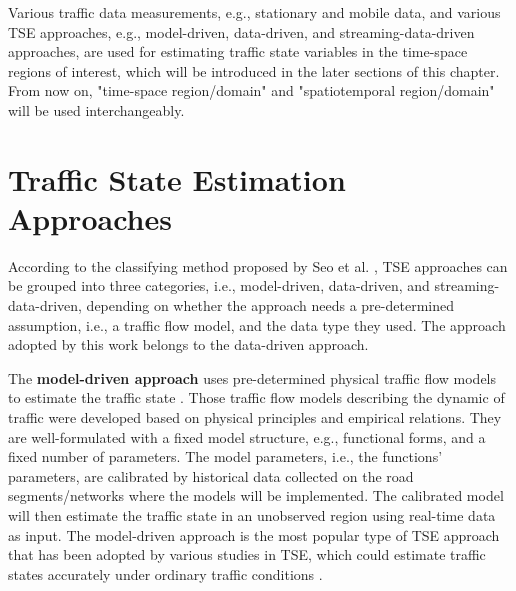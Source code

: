 \documentclass[english]{kththesis}
\begin{document}
Various traffic data measurements, e.g., stationary and mobile data, and various TSE approaches, e.g., model-driven, data-driven, and streaming-data-driven approaches, are used for estimating traffic state variables in the time-space regions of interest, which will be introduced in the later sections of this chapter. From now on, "time-space region/domain" and "spatiotemporal region/domain" will be used interchangeably.


\section{Traffic State Estimation Approaches}
\label{sec:tseApproaches}
According to the classifying method proposed by Seo et al. \cite{seo_tse}, TSE approaches can be grouped into three categories, i.e., model-driven, data-driven, and streaming-data-driven, depending on whether the approach needs a pre-determined assumption, i.e., a traffic flow model, and the data type they used. The approach adopted by this work belongs to the data-driven approach.

The \textbf{model-driven approach} uses pre-determined physical traffic flow models to estimate the traffic state \cite{seo_tse}. Those traffic flow models describing the dynamic of traffic were developed based on physical principles and empirical relations. They are well-formulated with a fixed model structure, e.g., functional forms, and a fixed number of parameters. The model parameters, i.e., the functions' parameters, are calibrated by historical data collected on the road segments/networks where the models will be implemented. The calibrated model will then estimate the traffic state in an unobserved region using real-time data as input. The model-driven approach is the most popular type of TSE approach that has been adopted by various studies in TSE, which could estimate traffic states accurately under ordinary traffic conditions \cite{seo_tse}.
\end{document}
